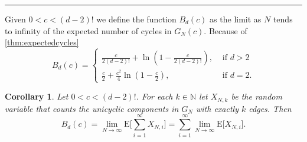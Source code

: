 \documentclass[11pt,notitlepage,a4paper]{article}
\newtheorem{corollary}{Corollary}[section]
\theoremstyle{definition}
\newcommand{\N}{\mathbb{N}}
\newcommand{\LN}{\lim\limits_{N\to \infty}}
\begin{document}
	\noindent\rule{2cm}{0.4pt}\par
		
	Given $0<c<(d-2)!$ we define the function $B_d(c)$ as 
	the limit as $N$ tends to infinity of the expected number of
	cycles in $G_N(c)$. Because of \cref{thm:expectedcycles}
	\[
	B_d(c)=\begin{cases}
	\frac{c}{2(d-2)!}+ \ln\left(1-\frac{c}{2(d-2)!}\right)
	,& \text{ if } d>2\\	
	\frac{c}{2}+ \frac{c^2}{4} \ln\left(1-\frac{c}{2}\right)
	, &\text{ if } d=2.
	\end{cases}
	\]	
		
	\begin{corollary} \label{thm:limitchangeunicycles}
		Let $0<c<(d-2)!$. For each $k\in \N$ let 
		$X_{N,k}$ be the random variable that counts the
		unicyclic components in $G_N$ with exactly $k$ edges. 
		Then 
		\[
	 	B_d(c)=\LN \mathrm{E}\big[\sum_{i=1}^\infty X_{N,i} \big]	
		= \sum_{i=1}^\infty \LN \mathrm{E}\big[ X_{N,i} \big].
		\]
	\end{corollary}
\end{document}
